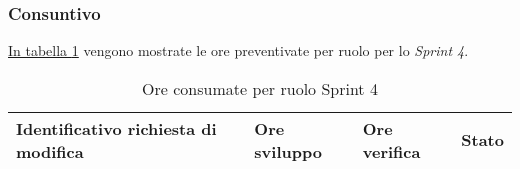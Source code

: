 \subsubsection{Consuntivo}

\hyperref[tab:sprint3_ore_consumate]{In tabella \ref{tab:sprint4_ore_consumate}} vengono mostrate le ore preventivate per ruolo per lo \textit{Sprint 4}.

\begin{table}[H]
    \centering
        \begin{tabular}{| l | l | l | l |}
            \hline
                \textbf{Identificativo richiesta di modifica} & 
                \textbf{Ore sviluppo} &
                \textbf{Ore verifica} & 
                \textbf{Stato}\\ 
    \hline
    \hline
    \end{tabular}
    \caption{Ore consumate per ruolo Sprint 4}
    \label{tab:sprint4_ore_consumate} 
\end{table}